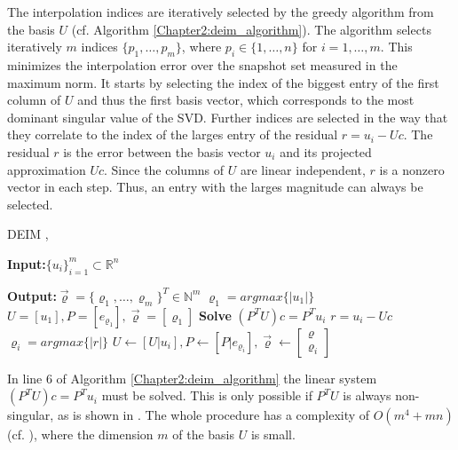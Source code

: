 The interpolation indices are iteratively selected by the greedy algorithm from the 
basis $U$ (cf. Algorithm \ref{Chapter2:deim_algorithm}). The algorithm selects iteratively $m$ indices $\{ p_1,\dots,p_m\}$, 
where $p_i \in \{1,\dots,n\}$ for $i = 1,\dots,m$. This minimizes the interpolation error over the
snapshot set measured in the maximum norm. It starts by selecting the index of the biggest 
entry of the first column of $U$ and thus the first basis vector, which corresponds to the 
most dominant singular value of the SVD. Further indices are selected in the way that they correlate to the 
index of the larges entry of the residual $r= u_i - Uc$. The residual $r$ is the error between the basis
vector $u_i$ and its projected approximation $Uc$. Since the columns of $U$ are linear independent, $r$ is
a nonzero vector in each step. Thus, an entry with the larges magnitude can always be selected.

\begin{algorithm}
\caption{DEIM , \cite{Chaturantabut2010Deim}}\label{Chapter2:deim_algorithm}
\begin{algorithmic}[1]
   \item \textbf{Input:}{$\{u_i\}_{i=1}^m \subset \mathbb{R}^n$ }
   \item \textbf{Output:}{$\vec{\varrho} = \{\varrho_1,\dots,\varrho_m\}^T \in \mathbb{N}^m$}
   \State $ \varrho_1 = argmax\{|u_1|\}$
   \State $U = [u_1], P = [e_{\varrho_1}], \vec{\varrho} = [\varrho_1]$
      \State \textbf{Solve}   $(P^TU)c= P^Tu_i$ 
      \State $r = u_i - Uc$
      \State $\varrho_i = argmax\{|r|\}$
      \State $U \gets [U | u_i], P \gets [P | e_{\varrho_i}], \vec{\varrho} \gets \left[\begin{array}{r}\varrho\\ \varrho_i \end{array}\right] $
   \EndFor
\end{algorithmic}
\end{algorithm}

\newpage
In line 6 of Algorithm \ref{Chapter2:deim_algorithm} the linear system 
$(P^TU)c= P^Tu_i$ must be solved. This is only possible if $P^TU$ is always non-singular, as is shown in \cite{Chaturantabut2010Deim}.
The whole procedure has a complexity  of $O(m^4+mn)$ (cf. \cite[Chapter 2.2.6]{Chaturantabut2010Deim}), where the dimension $m$ of the basis $U$ is
small.

